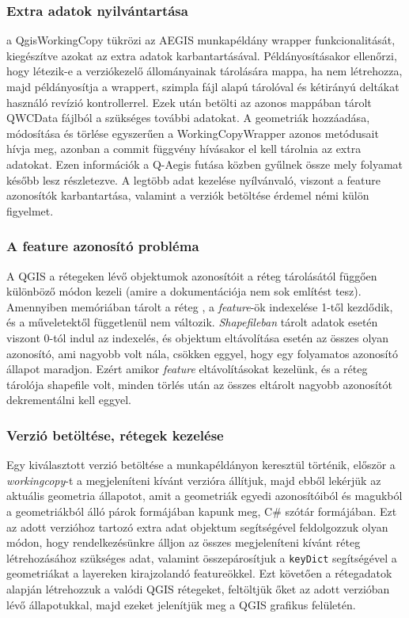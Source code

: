 \subsubsection{Extra adatok nyilvántartása}
a QgisWorkingCopy tükrözi az AEGIS munkapéldány wrapper funkcionalitását, kiegészítve azokat az extra adatok karbantartásával. Példányosításakor ellenőrzi, hogy létezik-e a verziókezelő állományainak tárolására mappa, ha nem létrehozza, majd példányosítja a wrappert, szimpla fájl alapú tárolóval és kétirányú deltákat használó revízió kontrollerrel. Ezek után betölti az azonos mappában tárolt QWCData fájlból a szükséges további adatokat.
A geometriák hozzáadása, módosítása és törlése egyszerűen a WorkingCopyWrapper azonos metódusait hívja meg, azonban a commit függvény hívásakor el kell tárolnia az extra adatokat. Ezen információk a Q-Aegis futása közben gyűlnek össze mely folyamat később lesz részletezve. A legtöbb adat kezelése nyílvánvaló, viszont a feature azonosítók karbantartása, valamint a verziók betöltése érdemel némi külön figyelmet.
\subsubsection{A feature azonosító probléma}
A QGIS a rétegeken lévő objektumok azonosítóit a réteg tárolásától függően különböző módon kezeli (amire a dokumentációja nem sok említést tesz). Amennyiben memóriában tárolt a réteg , a \emph{feature}-ök indexelése 1-től kezdődik, és a műveletektől függetlenül nem változik. \emph{Shapefileban} tárolt adatok esetén viszont 0-tól indul az indexelés, és objektum eltávolítása esetén az összes olyan azonosító, ami nagyobb volt nála, csökken eggyel, hogy egy folyamatos azonosító állapot maradjon. Ezért amikor \emph{feature} eltávolításokat kezelünk, és a réteg tárolója shapefile volt, minden törlés után az összes eltárolt nagyobb azonosítót dekrementálni kell eggyel.
\subsubsection{Verzió betöltése, rétegek kezelése}
Egy kiválasztott verzió betöltése a munkapéldányon keresztül történik, először a \emph{workingcopy}-t a megjeleníteni kívánt verzióra állítjuk, majd ebből lekérjük az aktuális geometria állapotot, amit a geometriák egyedi azonosítóiból és magukból a geometriákból álló párok formájában kapunk meg, C\# szótár formájában. Ezt az adott verzióhoz tartozó extra adat objektum segítségével feldolgozzuk olyan módon, hogy rendelkezésünkre álljon az összes megjeleníteni kívánt réteg létrehozásához szükséges adat, valamint összepárosítjuk a \texttt{keyDict} segítségével a geometriákat a layereken kirajzolandó featureökkel. Ezt követően a rétegadatok alapján létrehozzuk a valódi QGIS rétegeket, feltöltjük őket az adott verzióban lévő állapotukkal, majd ezeket jelenítjük meg a QGIS grafikus felületén.

